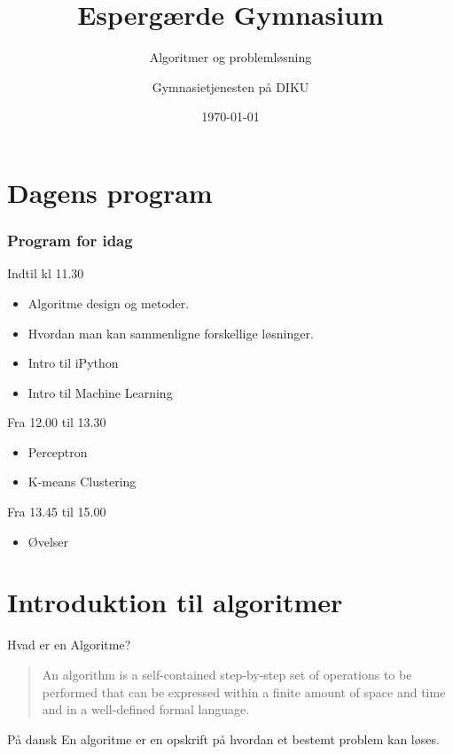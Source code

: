\documentclass[12pt,t]{beamer}
\title{Espergærde Gymnasium}
\subtitle{Algoritmer og problemløsning}
\author{
        Gymnasietjenesten på DIKU
}
\date[]{\today}
\begin{document}
\frame[plain]{\titlepage}

\section{Dagens program}

\begin{frame}
    \frametitle{Program for idag}
    \begin{block}{Indtil kl 11.30}
        \begin{itemize}
            \item Algoritme design og metoder. \pause
            \item Hvordan man kan sammenligne forskellige løsninger. \pause
            \item Intro til iPython \pause
            \item Intro til Machine Learning \pause
        \end{itemize}
    \end{block}
    \pause
    \begin{block}{Fra 12.00 til 13.30}
        \begin{itemize}
            \item Perceptron \pause
            \item K-means Clustering
        \end{itemize}
    \end{block}
    \begin{block}{Fra 13.45 til 15.00}
        \begin{itemize}
            \item Øvelser
        \end{itemize}
    \end{block}
\end{frame}


\section{Introduktion til algoritmer}
    \begin{frame}[c]{Hvad er en Algoritme?}
        \begin{quote}
            An algorithm is a self-contained step-by-step set of operations to
            be performed that can be expressed within a finite amount of space
            and time and in a well-defined formal language.
        \end{quote}
        \pause
        \begin{block}{På dansk}
            En algoritme er en \alert{opskrift} på hvordan et bestemt problem
            kan løses.
        \end{block}
    \end{frame}
\end{document}
